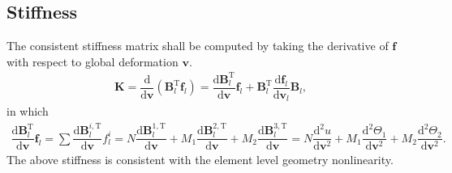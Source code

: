 \documentclass[11pt]{article}
\begin{document}
\subsection{Stiffness}
The consistent stiffness matrix shall be computed by taking the derivative of $\mathbf{f}$ with respect to global deformation $\mathbf{v}$.
\begin{gather}
\mathbf{K}=
\dfrac{\mathrm{d}}{\mathrm{d}\mathbf{v}}\left(\mathbf{B}_l^\mathrm{T}\mathbf{f}_l\right)=
\dfrac{\mathrm{d}\mathbf{B}_l^\mathrm{T}}{\mathrm{d}\mathbf{v}}\mathbf{f}_l+
\mathbf{B}_l^\mathrm{T}\dfrac{\mathrm{d}\mathbf{f}_l}{\mathrm{d}\mathbf{v}_l}\mathbf{B}_l,
\end{gather}
in which
\begin{gather}
\dfrac{\mathrm{d}\mathbf{B}_l^\mathrm{T}}{\mathrm{d}\mathbf{v}}\mathbf{f}_l=
\sum\dfrac{\mathrm{d}\mathbf{B}_l^{i,\mathrm{T}}}{\mathrm{d}\mathbf{v}}f_l^{i}=
N\dfrac{\mathrm{d}\mathbf{B}_l^{1,\mathrm{T}}}{\mathrm{d}\mathbf{v}}+
M_1\dfrac{\mathrm{d}\mathbf{B}_l^{2,\mathrm{T}}}{\mathrm{d}\mathbf{v}}+
M_2\dfrac{\mathrm{d}\mathbf{B}_l^{3,\mathrm{T}}}{\mathrm{d}\mathbf{v}}=
N\dfrac{\mathrm{d}^2u}{\mathrm{d}\mathbf{v}^2}+
M_1\dfrac{\mathrm{d}^2\Theta_1}{\mathrm{d}\mathbf{v}^2}+
M_2\dfrac{\mathrm{d}^2\Theta_2}{\mathrm{d}\mathbf{v}^2}.
\end{gather}
The above stiffness is consistent with the element level geometry nonlinearity.
\end{document}
